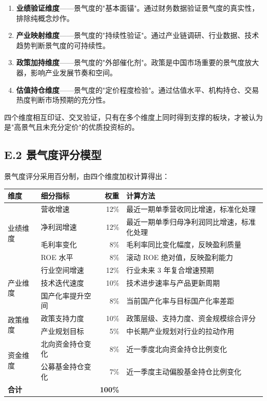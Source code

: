 \begin{enumerate}[leftmargin=2em]
\item \textbf{业绩验证维度}------景气度的"基本面锚"。通过财务数据验证景气度的真实性，排除纯概念炒作。
\item \textbf{产业映射维度}------景气度的"持续性验证"。通过产业链调研、行业数据、技术趋势判断景气度的可持续性。
\item \textbf{政策加持维度}------景气度的"外部催化剂"。政策是中国市场重要的景气度放大器，影响产业发展节奏和空间。
\item \textbf{估值持仓维度}------景气度的"定价程度检验"。通过估值水平、机构持仓、交易热度判断市场预期的充分性。
\end{enumerate}

四个维度相互印证、交叉验证，只有在多个维度上同时得到支撑的板块，才被认为是"高景气且未充分定价"的优质投资标的。

\subsection{E.2 景气度评分模型}

景气度评分采用百分制，由四个维度加权计算得出：

\begin{exhibitbox}[表 E-1：景气度评分体系及权重]
\centering
\small
\renewcommand{\arraystretch}{1.2}
\begin{tabularx}{\textwidth}{@{}l l r X@{}}
\toprule
\textbf{维度} & \textbf{细分指标} & \textbf{权重} & \textbf{计算方法} \\
\midrule
\multirow{4}{*}{业绩维度} & 营收增速 & 12\% & 最近一期单季营收同比增速，标准化处理 \\
& 净利润增速 & 12\% & 最近一期单季归母净利润同比增速，标准化处理 \\
& 毛利率变化 & 8\% & 毛利率同比变化幅度，反映盈利质量 \\
& ROE 水平 & 8\% & 滚动 ROE 绝对值，反映盈利能力 \\
\cmidrule(lr){2-4}
\multirow{3}{*}{产业维度} & 行业空间增速 & 12\% & 行业未来 3 年复合增速预期 \\
& 技术迭代速度 & 10\% & 技术进步速率与产品更新周期 \\
& 国产化率提升空间 & 8\% & 当前国产化率与目标国产化率差距 \\
\cmidrule(lr){2-4}
\multirow{2}{*}{政策维度} & 政策支持力度 & 10\% & 政策层级、支持力度、资金规模综合评分 \\
& 产业规划目标 & 5\% & 中长期产业规划对行业的拉动作用 \\
\cmidrule(lr){2-4}
\multirow{2}{*}{资金维度} & 北向资金持仓变化 & 8\% & 近一季度北向资金持仓比例变化 \\
& 公募基金持仓变化 & 7\% & 近一季度主动偏股基金持仓比例变化 \\
\midrule
\textbf{合计} & & \textbf{100\%} & \\
\bottomrule
\end{tabularx}
\vspace{0.5em}
\end{exhibitbox}


